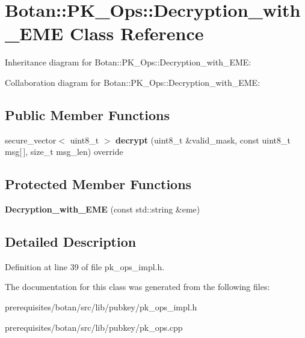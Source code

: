 \hypertarget{class_botan_1_1_p_k___ops_1_1_decryption__with___e_m_e}{}\section{Botan\+:\+:P\+K\+\_\+\+Ops\+:\+:Decryption\+\_\+with\+\_\+\+E\+ME Class Reference}
\label{class_botan_1_1_p_k___ops_1_1_decryption__with___e_m_e}


Inheritance diagram for Botan\+:\+:P\+K\+\_\+\+Ops\+:\+:Decryption\+\_\+with\+\_\+\+E\+ME\+:


Collaboration diagram for Botan\+:\+:P\+K\+\_\+\+Ops\+:\+:Decryption\+\_\+with\+\_\+\+E\+ME\+:
\subsection*{Public Member Functions}
\begin{DoxyCompactItemize}
\item 
\mbox{\label{class_botan_1_1_p_k___ops_1_1_decryption__with___e_m_e_a113996f0b5fffdac72db4e05e0bb8555}} 
secure\+\_\+vector$<$ uint8\+\_\+t $>$ {\bfseries decrypt} (uint8\+\_\+t \&valid\+\_\+mask, const uint8\+\_\+t msg\mbox{[}$\,$\mbox{]}, size\+\_\+t msg\+\_\+len) override
\end{DoxyCompactItemize}
\subsection*{Protected Member Functions}
\begin{DoxyCompactItemize}
\item 
\mbox{\label{class_botan_1_1_p_k___ops_1_1_decryption__with___e_m_e_aa1c92615f733a2c268c95a2d8c7220e8}} 
{\bfseries Decryption\+\_\+with\+\_\+\+E\+ME} (const std\+::string \&eme)
\end{DoxyCompactItemize}


\subsection{Detailed Description}


Definition at line 39 of file pk\+\_\+ops\+\_\+impl.\+h.



The documentation for this class was generated from the following files\+:\begin{DoxyCompactItemize}
\item 
prerequisites/botan/src/lib/pubkey/pk\+\_\+ops\+\_\+impl.\+h\item 
prerequisites/botan/src/lib/pubkey/pk\+\_\+ops.\+cpp\end{DoxyCompactItemize}
